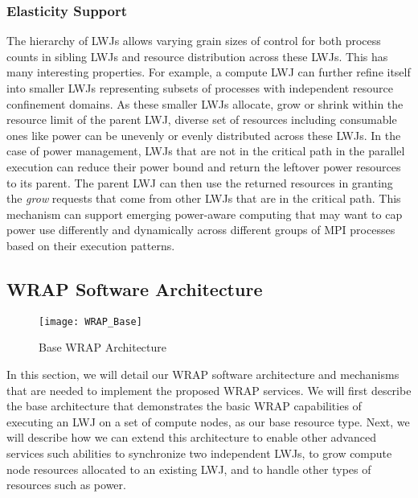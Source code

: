 %
%
%
%
%
%
%
%
%
%
%
%

\subsubsection{Elasticity Support}
The hierarchy of LWJs allows varying grain sizes of control 
for both process counts in sibling LWJs and 
resource distribution across these LWJs. This has many interesting
properties. For example, a compute LWJ can further refine itself 
into smaller LWJs representing subsets of processes with independent
resource confinement domains. 
As these smaller LWJs allocate, grow or shrink within the resource
limit of the parent LWJ, diverse set of resources including consumable ones
like power can be unevenly or evenly distributed across
these LWJs. In the case of power management, LWJs that are not in the critical path
in the parallel execution can reduce their power bound and return
the leftover power resources to its parent. The parent LWJ can then use the returned
resources in granting the {\em grow} requests that come from 
other LWJs that are in the critical path.    
This mechanism can support emerging power-aware computing 
that may want to cap power use differently and dynamically 
across different groups of MPI processes based on their execution patterns.  

\subsection{WRAP Software Architecture}
\label{sect:arch}
\begin{figure}
  \centering
    \texttt{[image: WRAP\_Base]}
  \caption{Base WRAP Architecture}
  \label{fig:base}
\end{figure}
In this section, we will detail our WRAP software architecture 
and mechanisms that are needed to implement the proposed WRAP services.
We will first describe the base architecture that demonstrates
the basic WRAP capabilities of executing an LWJ on a set of compute
nodes, as our base resource type. 
Next, we will describe how we can extend this architecture
to enable other advanced services such abilities to synchronize 
two independent LWJs, to grow compute node resources allocated to an existing 
LWJ, and to handle other types of resources such as power.

